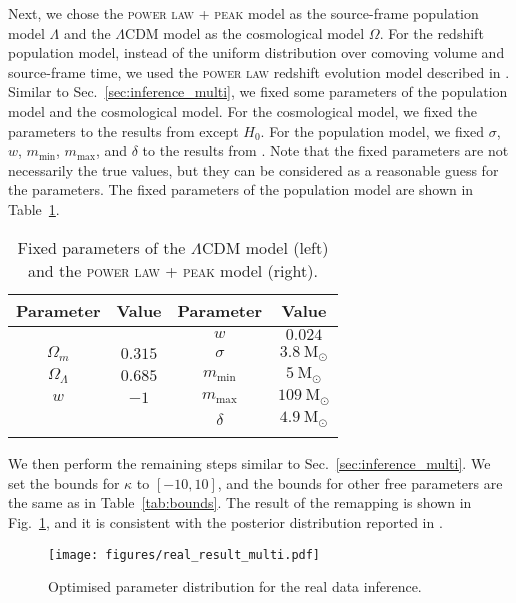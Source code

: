\documentclass[sn-aps, pdflatex, iicol]{sn-jnl}
\begin{document}
Next, we chose the \textsc{power law + peak} model as the source-frame population model $\Lambda$ and the $\Lambda$CDM model as the cosmological model $\Omega$.
For the redshift population model, instead of the uniform distribution over comoving volume and source-frame time, we used the \textsc{power law} redshift evolution model described in \cite{KAGRA:2021duu}.
Similar to Sec.~\ref{sec:inference_multi}, we fixed some parameters of the population model and the cosmological model.
For the cosmological model, we fixed the parameters to the results from \cite{Planck:2018vyg} except $H_0$.
For the population model, we fixed $\sigma$, $w$, $m_\mathrm{min}$, $m_\mathrm{max}$, and $\delta$ to the results from \cite{LIGOScientific:2021aug}.
Note that the fixed parameters are not necessarily the true values, but they can be considered as a reasonable guess for the parameters.
The fixed parameters of the population model are shown in Table~\ref{tab:fixed_parameters}.
\begin{table}[htbp]
    \caption{Fixed parameters of the $\Lambda$CDM model (left) and the \textsc{power law + peak} model (right).}
    \begin{tabular}{cc|cc}
        \toprule
        Parameter & Value & Parameter & Value  \\
        \midrule
         & & $w$ & $0.024$ \\
        $\Omega_m$ & $0.315$ & $\sigma$ & $3.8\ \mathrm{M}_\odot$\\
        $\Omega_\Lambda$ & $0.685$ & $m_\mathrm{min}$ & $5\ \mathrm{M}_\odot$ \\
        $w$ & $-1$ & $m_\mathrm{max}$ & $109\ \mathrm{M}_\odot$ \\
         & & $\delta$ & $4.9\ \mathrm{M}_\odot$\\
        \botrule
    \end{tabular}
    \label{tab:fixed_parameters}
\end{table}

We then perform the remaining steps similar to Sec.~\ref{sec:inference_multi}.
We set the bounds for $\kappa$ to $[-10, 10]$, and the bounds for other free parameters are the same as in Table~\ref{tab:bounds}.
The result of the remapping is shown in Fig.~\ref{fig:real_result_multi}, and it is consistent with the posterior distribution reported in \cite{KAGRA:2021duu}.
\begin{figure}
    \texttt{[image: figures/real\_result\_multi.pdf]}
    \caption{
        Optimised parameter distribution for the real data inference.
    }
    \label{fig:real_result_multi}
\end{figure}
\end{document}
